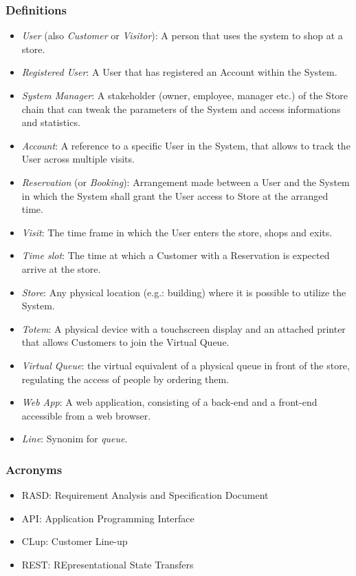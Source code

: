\subsubsection{Definitions}
\begin{itemize}
    \item \emph{User} (also \emph{Customer} or \emph{Visitor}): A person that uses the system to shop at a store.
    \item \emph{Registered User}: A User that has registered an Account within the System.
    \item \emph{System Manager}: A stakeholder (owner, employee, manager etc.) of the Store chain that can tweak the parameters of the System and access informations and statistics.
    \item \emph{Account}: A reference to a specific User in the System, that allows to track the User across multiple visits.
    \item \emph{Reservation} (or \emph{Booking}): Arrangement made between a User and the System in which the System shall grant the User access to Store at the arranged time.
    \item \emph{Visit}: The time frame in which the User enters the store, shops and exits.
    \item \emph{Time slot}: The time at which a Customer with a Reservation is expected arrive at the store.
    \item \emph{Store}: Any physical location (e.g.: building) where it is possible to utilize the System.
    \item \emph{Totem}: A physical device with a touchscreen display and an attached printer that allows Customers to join the Virtual Queue.
    \item \emph{Virtual Queue}: the virtual equivalent of a physical queue in front of the store, regulating the access of people by ordering them.
    \item \emph{Web App}: A web application, consisting of a back-end and a front-end accessible from a web browser.
    \item \emph{Line}: Synonim for \emph{queue}.
\end{itemize}

\subsubsection{Acronyms}
\begin{itemize}
    \item RASD: Requirement Analysis and Specification Document
    \item API: Application Programming Interface
    \item CLup: Customer Line-up
    \item REST: REpresentational State Transfers
\end{itemize}


